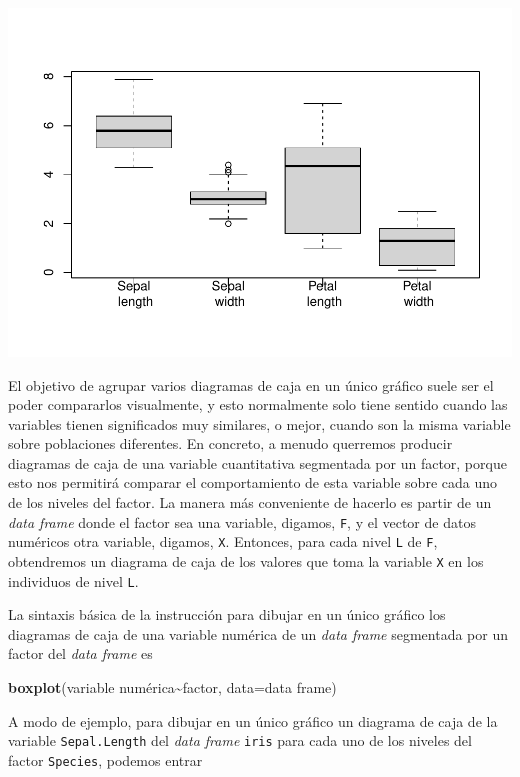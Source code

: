 \documentclass[
]{book}
\newenvironment{Shaded}{\begin{snugshade}}{\end{snugshade}}
\newcommand{\DataTypeTok}[1]{\textcolor[rgb]{0.13,0.29,0.53}{#1}}
\newcommand{\KeywordTok}[1]{\textcolor[rgb]{0.13,0.29,0.53}{\textbf{#1}}}
\newcommand{\NormalTok}[1]{#1}
\newcommand{\OperatorTok}[1]{\textcolor[rgb]{0.81,0.36,0.00}{\textbf{#1}}}
\theoremstyle{definition}
\theoremstyle{definition}
\theoremstyle{definition}
\theoremstyle{remark}
\begin{document}
\begin{center}\includegraphics[width=0.9\linewidth]{12chap12_Descripcion_cuantitativos_files/figure-latex/unnamed-chunk-46-1} \end{center}

El objetivo de agrupar varios diagramas de caja en un único gráfico suele ser el poder compararlos visualmente, y esto normalmente solo tiene sentido cuando las variables tienen significados muy similares, o mejor, cuando son la misma variable sobre poblaciones diferentes. En concreto, a menudo querremos producir diagramas de caja de una variable cuantitativa segmentada por un factor, porque esto nos permitirá comparar el comportamiento de esta variable sobre cada uno de los niveles del factor. La manera más conveniente de hacerlo es partir de un \emph{data frame} donde el factor sea una variable, digamos, \texttt{F}, y el vector de datos numéricos otra variable, digamos, \texttt{X}. Entonces, para cada nivel \texttt{L} de \texttt{F}, obtendremos un diagrama de caja de los valores que toma la variable \texttt{X} en los individuos de nivel \texttt{L}.

La sintaxis básica de la instrucción para dibujar en un único gráfico los diagramas de caja de una variable numérica de un \emph{data frame} segmentada por un factor del \emph{data frame} es

\begin{Shaded}
\begin{Highlighting}[]
\KeywordTok{boxplot}\NormalTok{(variable numérica}\OperatorTok{\textasciitilde{}}\NormalTok{factor, }\DataTypeTok{data=}\NormalTok{data frame)}
\end{Highlighting}
\end{Shaded}

A modo de ejemplo, para dibujar en un único gráfico un diagrama de caja de la variable \texttt{Sepal.Length} del \emph{data frame} \texttt{iris} para cada uno de los niveles del factor \texttt{Species}, podemos entrar
\end{document}
